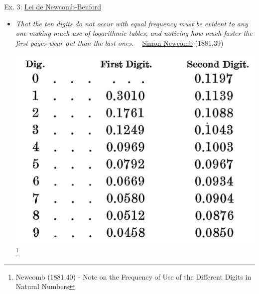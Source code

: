 \documentclass{beamer}\usepackage[]{graphicx}\usepackage[]{xcolor}
\begin{document}
\begin{frame}{Ex. 3: \href{https://en.wikipedia.org/wiki/Benford\%27s_law}{Lei de Newcomb-Benford}}
  \begin{itemize}
  \item \textit{That the ten digits do not occur with equal frequency must be evident to any one making much use of logarithmic tables, and noticing how much faster  the first pages wear out than the last ones.} $\;\;$ \href{https://en.wikipedia.org/wiki/Simon_Newcomb}{Simon Newcomb} (1881,39)
  \pause
  \bigskip
  \begin{center}
  \includegraphics[scale=0.3]{newcomb1881.png}\footnote{\tiny{Newcomb (1881,40) - Note on the Frequency of Use of the Different Digits in Natural Numbers}}
  \end{center}
  \end{itemize}
\end{frame}
\end{document}
